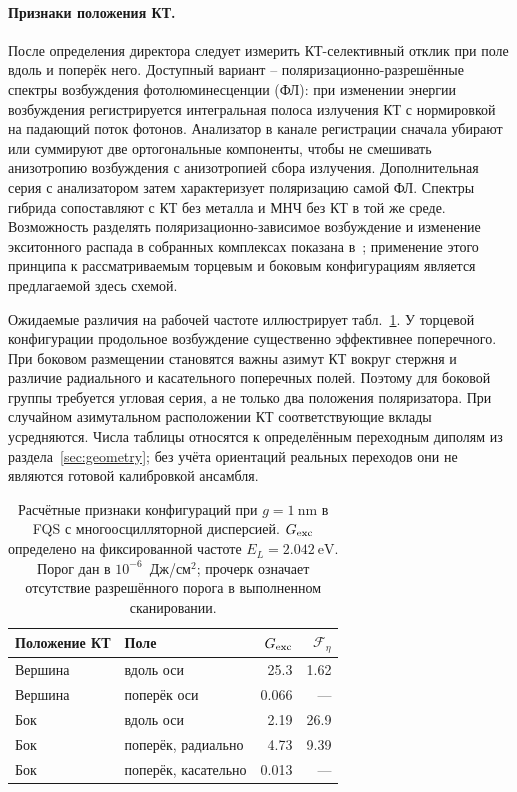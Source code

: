 \paragraph{Признаки положения КТ.}
После определения директора следует измерить КТ-селективный отклик при
поле вдоль и поперёк него. Доступный вариант -- поляризационно-разрешённые
спектры возбуждения фотолюминесценции (ФЛ): при изменении энергии
возбуждения регистрируется интегральная полоса излучения КТ с нормировкой
на падающий поток фотонов. Анализатор в канале регистрации сначала
убирают или суммируют две ортогональные компоненты, чтобы не смешивать
анизотропию возбуждения с анизотропией сбора излучения. Дополнительная
серия с анализатором затем характеризует поляризацию самой ФЛ.
Спектры гибрида сопоставляют с КТ без металла и МНЧ без КТ в той же среде.
Возможность разделять поляризационно-зависимое возбуждение и изменение
экситонного распада в собранных комплексах показана
в~\cite{cohenhoshen2012}; применение этого принципа к рассматриваемым
торцевым и боковым конфигурациям является предлагаемой здесь схемой.

Ожидаемые различия на рабочей частоте иллюстрирует
табл.~\ref{tab:spectral-signatures}. У торцевой конфигурации продольное
возбуждение существенно эффективнее поперечного. При боковом размещении
становятся важны азимут КТ вокруг стержня и различие радиального
и касательного поперечных полей. Поэтому для боковой группы требуется
угловая серия, а не только два положения поляризатора. При случайном
азимутальном расположении КТ соответствующие вклады усредняются.
Числа таблицы относятся к определённым переходным диполям из
раздела~\ref{sec:geometry}; без учёта ориентаций реальных переходов они
не являются готовой калибровкой ансамбля.

\begin{table}[tbp]
  \centering
  \caption{Расчётные признаки конфигураций при $g=\SI{1}{\nano\meter}$
  в FQS с многоосцилляторной дисперсией. $G_{\rm exc}$ определено
  на фиксированной частоте $E_L=\SI{2.042}{\electronvolt}$.
  Порог дан в $10^{-6}$~Дж/см$^2$; прочерк означает отсутствие
  разрешённого порога в выполненном сканировании.}
  \label{tab:spectral-signatures}
  \small
  \begin{tabular}{llrr}
    \toprule
    Положение КТ & Поле & $G_{\rm exc}$ & $\mathcal F_\eta$ \\
    \midrule
    Вершина & вдоль оси & 25.3 & 1.62 \\
    Вершина & поперёк оси & 0.066 & --- \\
    Бок & вдоль оси & 2.19 & 26.9 \\
    Бок & поперёк, радиально & 4.73 & 9.39 \\
    Бок & поперёк, касательно & 0.013 & --- \\
    \bottomrule
  \end{tabular}
\end{table}


